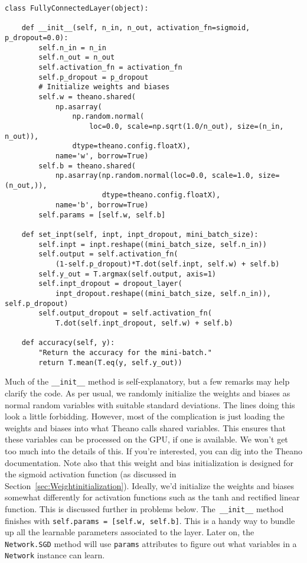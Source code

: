 \begin{lstlisting}
class FullyConnectedLayer(object):

    def __init__(self, n_in, n_out, activation_fn=sigmoid, p_dropout=0.0):
        self.n_in = n_in
        self.n_out = n_out
        self.activation_fn = activation_fn
        self.p_dropout = p_dropout
        # Initialize weights and biases
        self.w = theano.shared(
            np.asarray(
                np.random.normal(
                    loc=0.0, scale=np.sqrt(1.0/n_out), size=(n_in, n_out)),
                dtype=theano.config.floatX),
            name='w', borrow=True)
        self.b = theano.shared(
            np.asarray(np.random.normal(loc=0.0, scale=1.0, size=(n_out,)),
                       dtype=theano.config.floatX),
            name='b', borrow=True)
        self.params = [self.w, self.b]

    def set_inpt(self, inpt, inpt_dropout, mini_batch_size):
        self.inpt = inpt.reshape((mini_batch_size, self.n_in))
        self.output = self.activation_fn(
            (1-self.p_dropout)*T.dot(self.inpt, self.w) + self.b)
        self.y_out = T.argmax(self.output, axis=1)
        self.inpt_dropout = dropout_layer(
            inpt_dropout.reshape((mini_batch_size, self.n_in)), self.p_dropout)
        self.output_dropout = self.activation_fn(
            T.dot(self.inpt_dropout, self.w) + self.b)

    def accuracy(self, y):
        "Return the accuracy for the mini-batch."
        return T.mean(T.eq(y, self.y_out))
\end{lstlisting}

Much of the \lstinline{__init__} method is self-explanatory, but a few remarks may help clarify the code. As per usual, we randomly initialize the weights and biases as normal random variables with suitable standard deviations. The lines doing this look a little forbidding. However, most of the complication is just loading the weights and biases into what Theano calls shared variables. This ensures that these variables can be processed on the GPU, if one is available. We won't get too much into the details of this. If you're interested, you can dig into the Theano documentation. Note also that this weight and bias initialization is designed for the sigmoid activation function (as discussed in Section~\ref{sec:Weightinitialization}). Ideally, we'd initialize the weights and biases somewhat differently for activation functions such as the tanh and rectified linear function. This is discussed further in problems below. The\lstinline{ __init__} method finishes with \lstinline{self.params = [self.w, self.b]}. This is a handy way to bundle up all the learnable parameters associated to the layer. Later on, the \lstinline{Network.SGD} method will use \lstinline{params} attributes to figure out what variables in a \lstinline{Network} instance can learn.

